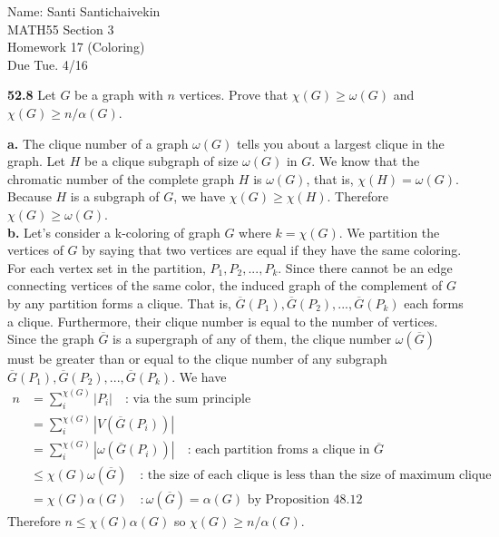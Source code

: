 \documentclass[10pt]{article}
\begin{document}
\begin{flushright}
	Name: Santi Santichaivekin \\
	MATH55 Section 3 \\
	Homework 17 (Coloring) \\
	Due Tue. 4/16
\end{flushright}


\begin{framed}
	\textbf{52.8} Let $G$ be a graph with $n$ vertices. Prove that
	$\chi(G) \geq \omega(G)$ and $\chi(G) \geq n/\alpha(G)$.
\end{framed}

\textbf{a.} The clique number of a graph $\omega(G)$ tells you about a largest
clique in the graph.  Let $H$ be a clique subgraph of size $\omega(G)$ in $G$.
We know that the chromatic number of the complete graph $H$ is $\omega(G)$, that is,
$\chi(H) = \omega(G)$.
Because $H$ is a subgraph of $G$, we have $\chi(G) \geq \chi(H)$. Therefore
$\chi(G) \geq \omega(G)$.\\

\textbf{b.} Let's consider a k-coloring of graph $G$ where $k = \chi(G)$. We partition the vertices of $G$ 
by saying that two vertices are equal if they have the same coloring. For each vertex set in 
the partition, $P_1, P_2, ..., P_k$. Since there cannot be an edge connecting vertices of the same 
color, the induced graph of the complement of $G$ by any partition forms a clique. That is,
$\overline{G}(P_1), \overline{G}(P_2), ..., \overline{G}(P_k)$ each forms a clique. 
Furthermore, their clique number is equal to the number of vertices. 
Since the graph 
$\overline{G}$ is a supergraph of any of them, the clique number $\omega(\overline{G})$ must be 
greater than or equal to the clique number of any subgraph $\overline{G}(P_1), \overline{G}(P_2), ..., \overline{G}(P_k)$.
We have
\begin{align*}
	n   &= \sum^{\chi(G)}_{i}|P_i| \quad \text{: via the sum principle}\\
		&= \sum^{\chi(G)}_{i}|V(\overline{G}(P_i))|\\
		&= \sum^{\chi(G)}_{i}|\omega(\overline{G}(P_i))| \quad \text{: each partition froms a clique in } \overline{G}\\ 
		&\leq \chi(G)\omega(\overline{G}) \quad \text{: the size of each clique is less than
		the size of maximum clique}\\
		&= \chi(G)\alpha(G) \quad : \omega(\overline{G}) = \alpha(G) \text{ by Proposition 48.12}
\end{align*}
Therefore $n \leq \chi(G)\alpha(G)$ so $\chi(G) \geq n/\alpha(G)$.
\end{document}
